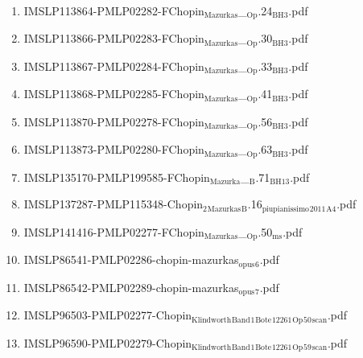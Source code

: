 \documentclass[11pt]{article}
\begin{document}
\begin{enumerate}
\begin{enumerate}
\item IMSLP113864-PMLP02282-FChopin$_{\text{Mazurkas}}$\_$_{\text{Op}}$.24$_{\text{BH3}}$.pdf
\label{sec-1-1-1-1-44-21-3-2}

\item IMSLP113866-PMLP02283-FChopin$_{\text{Mazurkas}}$\_$_{\text{Op}}$.30$_{\text{BH3}}$.pdf
\label{sec-1-1-1-1-44-21-3-3}

\item IMSLP113867-PMLP02284-FChopin$_{\text{Mazurkas}}$\_$_{\text{Op}}$.33$_{\text{BH3}}$.pdf
\label{sec-1-1-1-1-44-21-3-4}

\item IMSLP113868-PMLP02285-FChopin$_{\text{Mazurkas}}$\_$_{\text{Op}}$.41$_{\text{BH3}}$.pdf
\label{sec-1-1-1-1-44-21-3-5}

\item IMSLP113870-PMLP02278-FChopin$_{\text{Mazurkas}}$\_$_{\text{Op}}$.56$_{\text{BH3}}$.pdf
\label{sec-1-1-1-1-44-21-3-6}

\item IMSLP113873-PMLP02280-FChopin$_{\text{Mazurkas}}$\_$_{\text{Op}}$.63$_{\text{BH3}}$.pdf
\label{sec-1-1-1-1-44-21-3-7}

\item IMSLP135170-PMLP199585-FChopin$_{\text{Mazurka}}$\_$_{\text{B}}$.71$_{\text{BH13}}$.pdf
\label{sec-1-1-1-1-44-21-3-8}

\item IMSLP137287-PMLP115348-Chopin$_{\text{2}}$$_{\text{Mazurkas}}$$_{\text{B}}$.16$_{\text{piupianissimo}}$$_{\text{2011}}$$_{\text{A4}}$.pdf
\label{sec-1-1-1-1-44-21-3-9}

\item IMSLP141416-PMLP02277-FChopin$_{\text{Mazurkas}}$\_$_{\text{Op}}$.50$_{\text{ms}}$.pdf
\label{sec-1-1-1-1-44-21-3-10}

\item IMSLP86541-PMLP02286-chopin-mazurkas$_{\text{opus}}$$_{\text{6}}$.pdf
\label{sec-1-1-1-1-44-21-3-11}

\item IMSLP86542-PMLP02289-chopin-mazurkas$_{\text{opus}}$$_{\text{7}}$.pdf
\label{sec-1-1-1-1-44-21-3-12}

\item IMSLP96503-PMLP02277-Chopin$_{\text{Klindworth}}$$_{\text{Band}}$$_{\text{1}}$$_{\text{Bote}}$$_{\text{12261}}$$_{\text{Op}}$$_{\text{50}}$$_{\text{scan}}$.pdf
\label{sec-1-1-1-1-44-21-3-13}

\item IMSLP96590-PMLP02279-Chopin$_{\text{Klindworth}}$$_{\text{Band}}$$_{\text{1}}$$_{\text{Bote}}$$_{\text{12261}}$$_{\text{Op}}$$_{\text{59}}$$_{\text{scan}}$.pdf
\label{sec-1-1-1-1-44-21-3-14}


\end{enumerate}
\end{enumerate}
\end{document}
